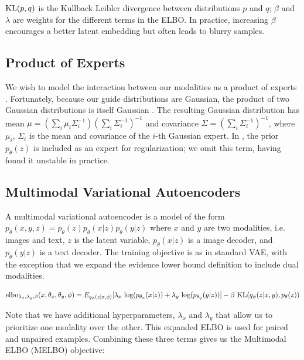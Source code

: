 \documentclass{article}
\begin{document}
$\textup{KL}(p, q)$ is the Kullback Leibler divergence between distributions $p$ and $q$; $\beta$ and $\lambda$ are weights for the different terms in the ELBO. In practice, increasing $\beta$ encourages a better latent embedding but often leads to blurry samples.

\subsection{Product of Experts}

We wish to model the interaction between our modalities as a product of experts \cite{hinton2006training}. Fortunately, because our guide distributions are Gaussian, the product of two Gaussian distributions is itself Gaussian \cite{cao2014generalized}. The resulting Gaussian distribution has mean $\mu = (\sum_{i} \mu_{i}\Sigma^{-1}_{i})(\sum_{i}\Sigma^{-1}_{i})^{-1}$ and covariance $\Sigma = (\sum_{i} \Sigma^{-1}_{i})^{-1}$, where $\mu_{i}$, $\Sigma_{i}$ is the mean and covariance of the $i$-th Gaussian expert. In \cite{hinton2006training}, the prior $p_{\theta}(z)$ is included as an expert for regularization; we omit this term, having found it unstable in practice.

\subsection{Multimodal Variational Autoencoders}

A multimodal variational autoencoder is a model of the form $p_{\theta}(x, y, z) = p_{\theta}(z)p_{\theta}(x|z)p_{\theta}(y|z)$ where $x$ and $y$ are two modalities, i.e. images and text, $z$ is the latent variable, $p_{\theta}(x|z)$ is a image decoder, and $p_{\theta}(y|z)$ is a text decoder. The training objective is as in standard VAE, with the exception that we expand the evidence lower bound definition to include dual modalities.

\begin{equation}
    \textup{elbo}_{\lambda_{x}, \lambda_{y}, \beta}(x, \theta_{x}, \theta_{y}, \phi) = E_{q_{\phi}(z|x, \phi)}[\lambda_{x} \textup{ log}(p_{\theta_{x}}(x|z)) + \lambda_{y} \textup{ log}(p_{\theta_{y}}(y|z))] - \beta \textup{ KL}(q_{\phi}(z|x, y), p_{\theta}(z))
\end{equation}

Note that we have additional hyperparameters, $\lambda_{x}$ and $\lambda_{y}$ that allow us to prioritize one modality over the other. This expanded ELBO is used for paired and unpaired examples. Combining these three terms gives us the Multimodal ELBO (MELBO) objective:
\end{document}
